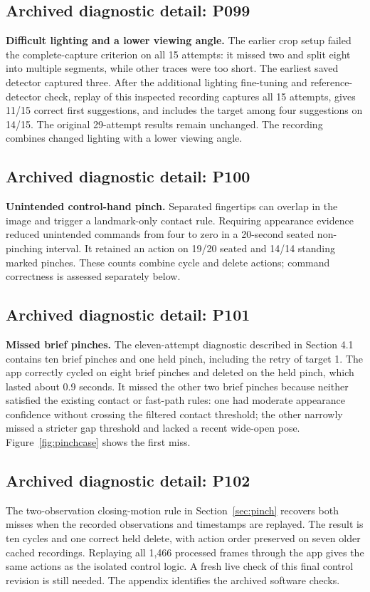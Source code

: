 \subsection*{Archived diagnostic detail: P099}
\textbf{Difficult lighting and a lower viewing angle.} The earlier crop setup failed the complete-capture criterion on all 15 attempts: it missed two and split eight into multiple segments, while other traces were too short. The earliest saved detector captured three. After the additional lighting fine-tuning and reference-detector check, replay of this inspected recording captures all 15 attempts, gives 11/15 correct first suggestions, and includes the target among four suggestions on 14/15. The original 29-attempt results remain unchanged. The recording combines changed lighting with a lower viewing angle.

\subsection*{Archived diagnostic detail: P100}
\textbf{Unintended control-hand pinch.} Separated fingertips can overlap in the image and trigger a landmark-only contact rule. Requiring appearance evidence reduced unintended commands from four to zero in a 20-second seated non-pinching interval. It retained an action on 19/20 seated and 14/14 standing marked pinches. These counts combine cycle and delete actions; command correctness is assessed separately below.

\subsection*{Archived diagnostic detail: P101}
\textbf{Missed brief pinches.} The eleven-attempt diagnostic described in Section 4.1 contains ten brief pinches and one held pinch, including the retry of target 1. The app correctly cycled on eight brief pinches and deleted on the held pinch, which lasted about 0.9 seconds. It missed the other two brief pinches because neither satisfied the existing contact or fast-path rules: one had moderate appearance confidence without crossing the filtered contact threshold; the other narrowly missed a stricter gap threshold and lacked a recent wide-open pose. Figure~\ref{fig:pinchcase} shows the first miss.

\subsection*{Archived diagnostic detail: P102}
The two-observation closing-motion rule in Section~\ref{sec:pinch} recovers both misses when the recorded observations and timestamps are replayed. The result is ten cycles and one correct held delete, with action order preserved on seven older cached recordings. Replaying all 1,466 processed frames through the app gives the same actions as the isolated control logic. A fresh live check of this final control revision is still needed. The appendix identifies the archived software checks.

